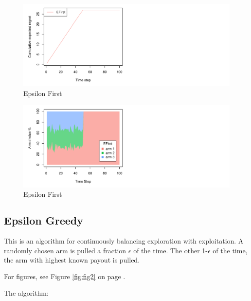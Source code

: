 \documentclass[nojss]{jss}\usepackage[]{graphicx}\usepackage[]{color}
\makeatletter
\def\maxwidth{ %
  \ifdim\Gin@nat@width>\linewidth
    \linewidth
  \else
    \Gin@nat@width
  \fi
}
\newenvironment{knitrout}{}{} %
\makeatother
\begin{document}
\begin{center}
\begin{knitrout}
\color{fgcolor}\begin{figure}[H]
\includegraphics[width=\maxwidth,]{fig/fig1-1} \caption[Epsilon First]{Epsilon First}\label{fig:fig11}
\end{figure}

\begin{figure}[H]
\includegraphics[width=\maxwidth,]{fig/fig1-2} \caption[Epsilon First]{Epsilon First}\label{fig:fig12}
\end{figure}


\end{knitrout}
\end{center}


\subsection{Epsilon Greedy}

This is an algorithm for continuously balancing exploration with exploitation. A randomly chosen arm is pulled a fraction $\epsilon$ of the time. The other 1-$\epsilon$ of the time, the arm with highest known payout is pulled.

For figures, see Figure \ref{fig:fig2} on page \pageref{fig:fig2}.

The algorithm:
\end{document}
